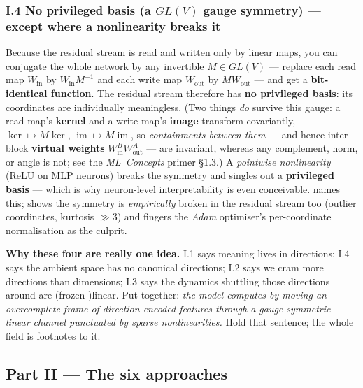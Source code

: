 \subsubsection*{I.4 No privileged basis (a $GL(V)$ gauge symmetry) --- except where a nonlinearity breaks it}

Because the residual stream is read and written only by linear maps, you can conjugate the whole network by any invertible $M\in GL(V)$ --- replace each read map $W_{\text{in}}$ by $W_{\text{in}}M^{-1}$ and each write map $W_{\text{out}}$ by $M W_{\text{out}}$ --- and get a \textbf{bit-identical function}. The residual stream therefore has \textbf{no privileged basis}: its coordinates are individually meaningless. (Two things \emph{do} survive this gauge: a read map's \textbf{kernel} and a write map's \textbf{image} transform covariantly, $\ker\mapsto M\ker$, $\operatorname{im}\mapsto M\operatorname{im}$, so \emph{containments between them} --- and hence inter-block \textbf{virtual weights} $W_{\text{in}}^B W_{\text{out}}^A$ --- are invariant, whereas any complement, norm, or angle is not; see the \emph{ML~Concepts} primer §1.3.) A \emph{pointwise nonlinearity} (ReLU on MLP neurons) breaks the symmetry and singles out a \textbf{privileged basis} --- which is why neuron-level interpretability is even conceivable. \textcite{mech-interp-variables-bases} names this; \textcite{privileged-bases-residual-stream} shows the symmetry is \emph{empirically} broken in the residual stream too (outlier coordinates, kurtosis $\gg 3$) and fingers the \emph{Adam} optimiser's per-coordinate normalisation as the culprit.


\begin{callout}
\textbf{Why these four are really one idea.} I.1 says meaning lives in directions; I.4 says the ambient space has no canonical directions; I.2 says we cram more directions than dimensions; I.3 says the dynamics shuttling those directions around are (frozen-)linear. Put together: \emph{the model computes by moving an overcomplete frame of direction-encoded features through a gauge-symmetric linear channel punctuated by sparse nonlinearities.} Hold that sentence; the whole field is footnotes to it.

\end{callout}


\subsection*{Part II --- The six approaches}


